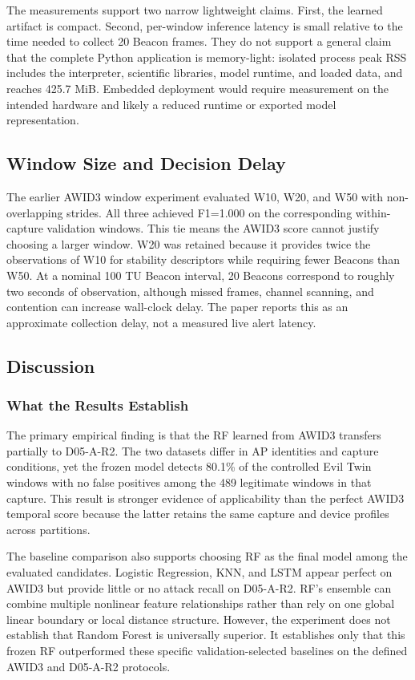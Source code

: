 \documentclass[conference]{IEEEtran}
\begin{document}
The measurements support two narrow lightweight claims. First, the learned artifact is compact. Second, per-window inference latency is small relative to the time needed to collect 20 Beacon frames. They do not support a general claim that the complete Python application is memory-light: isolated process peak RSS includes the interpreter, scientific libraries, model runtime, and loaded data, and reaches 425.7 MiB. Embedded deployment would require measurement on the intended hardware and likely a reduced runtime or exported model representation.

\subsection{Window Size and Decision Delay}

The earlier AWID3 window experiment evaluated W10, W20, and W50 with non-overlapping strides. All three achieved F1=1.000 on the corresponding within-capture validation windows. This tie means the AWID3 score cannot justify choosing a larger window. W20 was retained because it provides twice the observations of W10 for stability descriptors while requiring fewer Beacons than W50. At a nominal 100 TU Beacon interval, 20 Beacons correspond to roughly two seconds of observation, although missed frames, channel scanning, and contention can increase wall-clock delay. The paper reports this as an approximate collection delay, not a measured live alert latency.

\subsection{Discussion}

\subsubsection{What the Results Establish}

The primary empirical finding is that the RF learned from AWID3 transfers partially to D05-A-R2. The two datasets differ in AP identities and capture conditions, yet the frozen model detects 80.1\% of the controlled Evil Twin windows with no false positives among the 489 legitimate windows in that capture. This result is stronger evidence of applicability than the perfect AWID3 temporal score because the latter retains the same capture and device profiles across partitions.

The baseline comparison also supports choosing RF as the final model among the evaluated candidates. Logistic Regression, KNN, and LSTM appear perfect on AWID3 but provide little or no attack recall on D05-A-R2. RF's ensemble can combine multiple nonlinear feature relationships rather than rely on one global linear boundary or local distance structure. However, the experiment does not establish that Random Forest is universally superior. It establishes only that this frozen RF outperformed these specific validation-selected baselines on the defined AWID3 and D05-A-R2 protocols.
\end{document}
